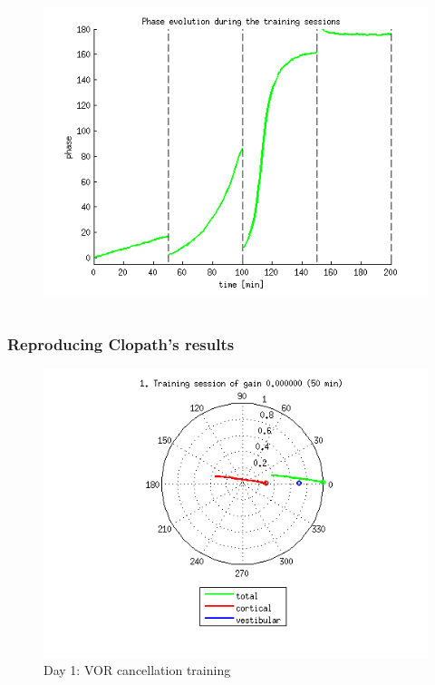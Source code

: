 \documentclass[10pt, compress]{beamer}
\begin{document}
\begin{frame}[fragile]
\begin{columns}[onlytextwidth]
\begin{figure}
      \includegraphics[scale=0.35]{images/longnoi_13.png}
    \end{figure}
  \end{columns}
\end{frame}

\begin{frame}[fragile]
  \frametitle{Reproducing Clopath's results}
  \begin{figure}
    \includegraphics[scale=0.5]{images/longnoi_19.png}
    \caption{Day 1: VOR cancellation training}
  \end{figure}
\end{frame}
\end{document}
